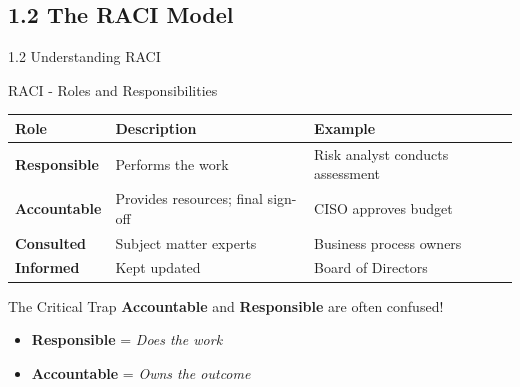 \documentclass[10pt]{beamer}  %
\begin{document}
	\subsection{1.2 The RACI Model}
	\begin{frame}{1.2 Understanding RACI}
		\begin{block}{RACI - Roles and Responsibilities}
			\begin{tabular}{|p{2cm}|p{3.5cm}|p{5cm}|}
				\hline
				\textbf{Role} & \textbf{Description} & \textbf{Example} \\
				\hline
				\textbf{Responsible} & Performs the work & Risk analyst conducts assessment \\
				\hline
				\textbf{Accountable} & Provides resources; final sign-off & CISO approves budget \\
				\hline
				\textbf{Consulted} & Subject matter experts & Business process owners \\
				\hline
				\textbf{Informed} & Kept updated & Board of Directors \\
				\hline
			\end{tabular}
		\end{block}
		
		\begin{alertblock}{The Critical Trap}
			\textbf{Accountable} and \textbf{Responsible} are often confused!
			\begin{itemize}
				\item \textbf{Responsible} = \textit{Does the work}
				\item \textbf{Accountable} = \textit{Owns the outcome}
			\end{itemize}
		\end{alertblock}
	\end{frame}
	
\end{document}
